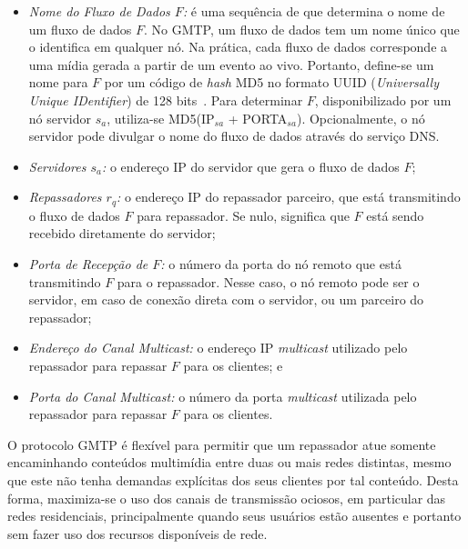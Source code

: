 \begin{itemize}	
	\item \textit{Nome do Fluxo de Dados $F$:} é uma sequência de
	 que determina o nome de um fluxo de dados $F$.
	No GMTP, um fluxo de dados tem um nome único que o identifica em qualquer nó. Na prática, cada fluxo de dados corresponde a uma mídia gerada a partir de um evento ao vivo. Portanto, define-se um nome para $F$ por um código de \textit{hash} MD5 no formato UUID (\textit{Universally Unique IDentifier}) de 128 bits~\cite{RFC4122}. 
	Para determinar $F$, disponibilizado por um nó servidor $s_a$, utiliza-se MD5(IP$_{sa}$ + PORTA$_{sa}$). Opcionalmente, o nó servidor pode divulgar o nome do fluxo de dados através do serviço DNS.
	
	\item \textit{Servidores $s_a$:} o endereço IP do servidor que gera o fluxo de dados $F$;
	
	\item \textit{Repassadores $r_q$:} o endereço IP do repassador	parceiro, que está transmitindo o fluxo de dados $F$ para repassador. Se nulo, significa que $F$ está sendo recebido diretamente do servidor;
	
	\item \textit{Porta de Recepção de $F$:} o número da porta do nó remoto
	que está transmitindo $F$ para o repassador. Nesse caso, o nó remoto pode ser o servidor, em caso de conexão direta com o servidor, ou um parceiro do repassador;
	
	\item \textit{Endereço do Canal \textit{Multicast}:} o endereço IP \textit{multicast} utilizado pelo repassador para repassar $F$ para os clientes; e
	
	\item \textit{Porta do Canal \textit{Multicast}:} o número da porta \textit{multicast} utilizada pelo repassador para repassar $F$ para os clientes.
\end{itemize}

O protocolo GMTP é flexível para permitir que um repassador atue somente encaminhando conteúdos multimídia entre duas ou mais redes distintas, mesmo que este não tenha demandas explícitas dos seus clientes por tal conteúdo. 
Desta forma, maximiza-se o uso dos canais de transmissão ociosos, em particular das redes residenciais, principalmente quando seus usuários estão ausentes e portanto sem fazer uso dos recursos disponíveis de rede.

